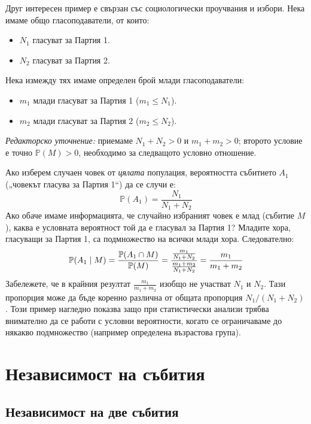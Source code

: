 \begin{example}[Гласоподаватели]\label{ex:03-2}

Друг интересен пример е свързан със социологически проучвания и избори.
Нека имаме общо гласоподаватели, от които:
\begin{itemize}
    \item $N_1$ гласуват за Партия 1.
    \item $N_2$ гласуват за Партия 2.
\end{itemize}
Нека измежду тях имаме определен брой млади гласоподаватели:
\begin{itemize}
    \item $m_1$ млади гласуват за Партия 1 ($m_1 \le N_1$).
    \item $m_2$ млади гласуват за Партия 2 ($m_2 \le N_2$).
\end{itemize}

\emph{Редакторско уточнение:} приемаме $N_1+N_2>0$ и $m_1+m_2>0$; второто условие е точно $\mathbb{P}(M)>0$, необходимо за следващото условно отношение.

Ако изберем случаен човек от \emph{цялата} популация, вероятността събитието $A_1$ („човекът гласува за Партия 1“) да се случи е:
\[
\mathbb{P}(A_1) = \frac{N_1}{N_1 + N_2}
\]
Ако обаче имаме информацията, че случайно избраният човек е млад (събитие $M$), каква е условната вероятност той да е гласувал за Партия 1?
Младите хора, гласуващи за Партия 1, са подмножество на всички млади хора. Следователно:
\[
\mathbb{P}(A_1 \mid M) = \frac{\mathbb{P}(A_1 \cap M)}{\mathbb{P}(M)} = \frac{\frac{m_1}{N_1 + N_2}}{\frac{m_1 + m_2}{N_1 + N_2}} = \frac{m_1}{m_1 + m_2}
\]
Забележете, че в крайния резултат $\frac{m_1}{m_1 + m_2}$ изобщо не участват $N_1$ и $N_2$. Тази пропорция може да бъде коренно различна от общата пропорция $N_1 / (N_1 + N_2)$. Този пример нагледно показва защо при статистически анализи трябва внимателно да се работи с условни вероятности, когато се ограничаваме до някакво подмножество (например определена възрастова група).

\end{example}

\section{Независимост на събития}

\subsection{Независимост на две събития}

